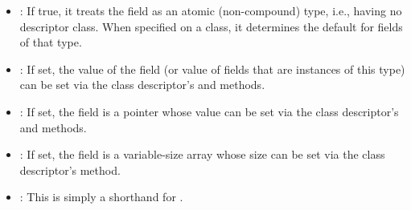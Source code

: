 \begin{itemize}

  \item {}: If true, it treats the field as an atomic
    (non-compound) type, i.e., having no descriptor class. When specified on a
    class, it determines the default for fields of that type.

  \item {}: If set, the value of the field (or value of fields
    that are instances of this type) can be set via the class descriptor's
     and  methods.

  \item {}: If set, the field is a pointer whose value can
    be set via the class descriptor's  and
     methods.

  \item {}: If set, the field is a variable-size array whose
    size can be set via the class descriptor's 
    method.

  \item {}: This is simply a shorthand for
    .

\end{itemize}
